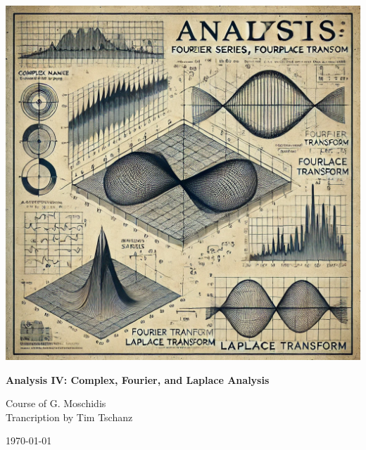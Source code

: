 \documentclass[a4paper,11pt]{book}
\title{\doctitle}
\author{\docauthor}
\date{\today}
\newcommand{\doctitle}{Analysis IV: Complex, Fourier, and Laplace Analysis}
\newcommand{\docauthor}{Course of G. Moschidis\\Trancription by Tim Tschanz}
\begin{document}
\begin{titlepage}
    \centering
    \includegraphics[width=\textwidth]{Cover_Image.png}
    {\huge\bfseries \doctitle \par}
    {
        \vspace{1cm}
        {\large \docauthor \par}
        \vspace{1cm}
    }
    {\large \today\par}
\end{titlepage}

\tableofcontents







\end{document}
